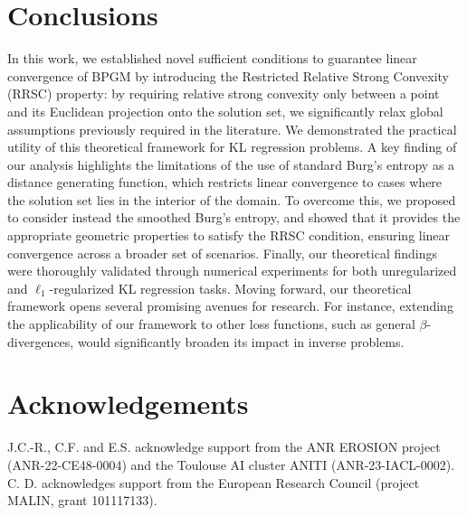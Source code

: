 \documentclass[11pt]{amsart}
\begin{document}
\section{Conclusions}
In this work, we established novel sufficient conditions to guarantee linear convergence of BPGM by introducing the Restricted Relative Strong Convexity (RRSC) property: by requiring relative strong convexity only between a point and its Euclidean projection onto the solution set, we significantly relax global assumptions previously required in the literature. 
We demonstrated the practical utility of this theoretical framework for KL regression problems. A key finding of our analysis highlights the limitations of the use of standard Burg's entropy as a distance generating function, which restricts linear convergence to cases where the solution set lies in the interior of the domain. To overcome this, we proposed to consider instead the smoothed Burg's entropy, and showed that it provides the appropriate geometric properties to satisfy the RRSC condition, ensuring linear convergence across a broader set of scenarios. Finally, our theoretical findings were thoroughly validated through numerical experiments
for both unregularized and $\ell_1$-regularized KL regression tasks. Moving forward, our theoretical framework opens several promising avenues for research. For instance, extending the applicability of our framework to other loss functions, such as general $\beta$-divergences, would significantly broaden its impact in inverse problems.

\section{Acknowledgements}
J.C.-R., C.F. and E.S. acknowledge support from the ANR EROSION project (ANR-22-CE48-0004) and the Toulouse AI cluster ANITI (ANR-23-IACL-0002). C. D. acknowledges support from the European Research Council (project MALIN, grant
101117133).
{}


\appendix

\end{document}
